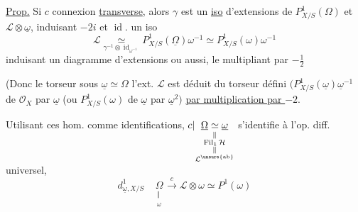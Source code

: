 \uline{Prop.} Si $c$ connexion \uline{transverse},  alors $\gamma$ est un \uline{iso} d'extensions de $P^1_{X/S}(\Omega)$
et $\mathcal{L}\otimes\underline{\omega}$, induisant $-2i$ et $\operatorname{id}$.  un iso
\[
\mathcal{L}\underset{\gamma^{-1}\otimes\operatorname{id}_{\omega^{-1}}}{\simeq}P^1_{X/S}(\underline{\Omega})\omega^{-1}\simeq P^1_{X/S}(\omega)\omega^{-1}
\]
induisant un diagramme d'extensions
\margin{\textcircled{$\alpha$}}
ou aussi, le multipliant par $-\frac12$

(Donc le torseur sous $\underline{\omega}\simeq\Omega$  l'ext. $\mathcal{L}$ est déduit du torseur  défini  $(P^1_{X/S}(\underline{\omega})\underline{\omega}^{-1}$ de $\mathcal{O}_X$ par $\underline{\omega}$ (ou $P^1_{X/S}(\omega)$ de $\underline{\omega}$ par $\underline{\omega}^2)$ \uline{par multiplication par $-2$}.

Utilisant ces hom. comme identifications,
$c|\underset{\substack{\Vert\\\operatorname{Fil}_1\mathcal{H}\\\Vert\\\mathcal{L}^{\unsure{\mathrm{ab}}}}}{\underline{\Omega}\simeq\underline{\omega}}$ s'identifie à l'op. diff. universel,
\[
d^1_{\underline{\omega},X/S}\quad
\underset{\substack{\Vert\\\omega}}{\Omega}\xrightarrow{c}\mathcal{L}\otimes\omega\simeq P^1(\omega)
\]

